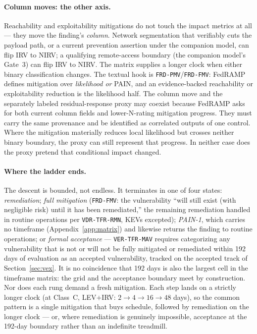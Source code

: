 \documentclass[11pt]{article}
\newcommand{\code}[1]{\texttt{#1}}
\begin{document}
\paragraph{Column moves: the other axis.} Reachability and exploitability
mitigations do not touch the impact metrics at all --- they move the finding's
\emph{column}. Network segmentation that verifiably cuts the payload path, or a
current prevention assertion under the companion model, can flip IRV to NIRV; a
qualifying remote-access boundary (the companion model's Gate~3) can flip IRV to
NIRV. The matrix supplies a longer clock when either binary classification changes.
The textual hook is
\code{FRD-PMV}/\code{FRD-FMV}: FedRAMP defines mitigation over \emph{likelihood or}
PAIN, and an evidence-backed reachability or exploitability reduction is the
likelihood half. The column move and the separately labeled residual-response
proxy may coexist because FedRAMP asks for both current column fields and
lower-N-rating mitigation progress. They must carry the same provenance and be
identified as correlated outputs of one control. Where the mitigation materially
reduces local likelihood but crosses neither binary boundary, the proxy can still
represent that progress. In neither case does the proxy pretend that conditional
impact changed.

\paragraph{Where the ladder ends.} The descent is bounded, not endless. It
terminates in one of four states: \emph{remediation}; \emph{full mitigation}
(\code{FRD-FMV}: the vulnerability ``will still exist (with negligible risk) until
it has been remediated,'' the remaining remediation handled in routine operations
per \code{VDR-TFR-RMN}, KEVs excepted); \emph{PAIN-1}, which carries no timeframe
(Appendix~\ref{app:matrix}) and likewise returns the finding to routine operations;
or \emph{formal acceptance} --- \code{VER-TFR-MAV} requires categorizing any
vulnerability that is not or will not be fully mitigated or remediated within 192
days of evaluation as an accepted vulnerability, tracked on the accepted track of
Section~\ref{sec:vex}. It is no coincidence that 192 days is also the largest cell
in the timeframe matrix: the grid and the acceptance boundary meet by construction.
Nor does each rung demand a fresh mitigation. Each step lands on a strictly longer
clock (at Class~C, LEV$+$IRV: $2 \rightarrow 4 \rightarrow 16 \rightarrow 48$
days), so the common pattern is a single mitigation that buys schedule, followed by
remediation on the longer clock --- or, where remediation is genuinely impossible,
acceptance at the 192-day boundary rather than an indefinite treadmill.
\end{document}
